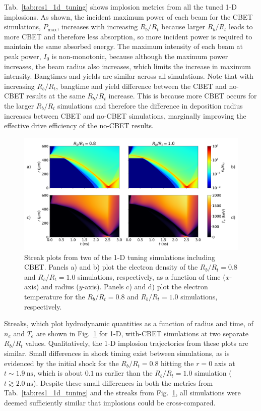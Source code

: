 Tab.~\ref{tab:res1_1d_tuning} shows implosion metrics from all the tuned 1-D implosions.
As shown, the incident maximum power of each beam for the \ac{CBET} simulations, $P_{\text{max}}$, increases with increasing $R_b/R_t$ because larger $R_b/R_t$ leads to more \ac{CBET} and therefore less absorption, so more incident power is required to maintain the same absorbed energy.
The maximum intensity of each beam at peak power, $I_0$ is non-monotonic, because although the maximum power increases, the beam radius also increases, which limits the increase in maximum intensity.
Bangtimes and yields are similar across all simulations.
Note that with increasing $R_b/R_t$, bangtime and yield difference between the \ac{CBET} and no-\ac{CBET} results at the same $R_b/R_t$ increase.
This is because more \ac{CBET} occurs for the larger $R_b/R_t$ simulations and therefore the difference in deposition radius increases between \ac{CBET} and no-\ac{CBET} simulations, marginally improving the effective drive efficiency of the no-\ac{CBET} results.

\begin{figure}[t!]
    \includegraphics[width=\linewidth]{Results1/Images/streaks.png}
    \centering
    \caption{Streak plots from two of the 1-D tuning simulations including \ac{CBET}.
    Panels a) and b) plot the electron density of the $R_b/R_t=0.8$ and $R_b/R_t=1.0$ simulations, respectively, as a function of time ($x$-axis) and radius ($y$-axis).
    Panels c) and d) plot the electron temperature for the $R_b/R_t=0.8$ and $R_b/R_t=1.0$ simulations, respectively.}%
    \label{fig:Res1_streaks}
\end{figure}

Streaks, which plot hydrodynamic quantities as a function of radius and time, of $n_e$ and $T_e$ are shown in Fig.~\ref{fig:Res1_streaks} for 1-D, with-\ac{CBET} simulations at two separate $R_b/R_t$ values.
Qualitatively, the 1-D implosion trajectories from these plots are similar.
Small differences in shock timing exist between simulations, as is evidenced by the initial shock for the $R_b/R_t=0.8$ hitting the $r=0$ axis at $t\sim1.9\ \text{ns}$, which is about $0.1\ \text{ns}$ earlier than the $R_b/R_t=1.0$ simulation ($t\gtrsim2.0\ \text{ns}$).
Despite these small differences in both the metrics from Tab.~\ref{tab:res1_1d_tuning} and the streaks from Fig.~\ref{fig:Res1_streaks}, all simulations were deemed sufficiently similar that implosions could be cross-compared.

